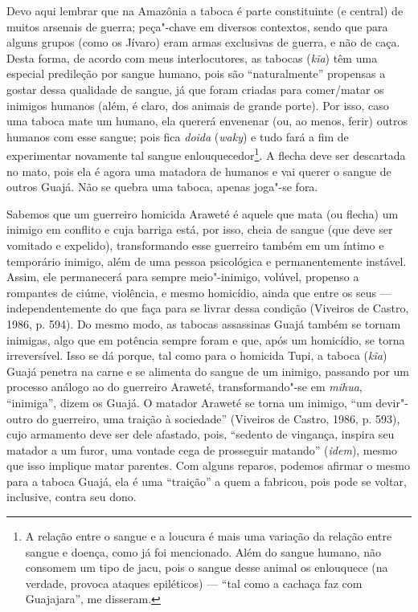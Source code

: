 Devo aqui lembrar que na Amazônia a taboca é parte constituinte (e
central) de muitos arsenais de guerra; peça"-chave em diversos contextos,
sendo que para alguns grupos (como os Jívaro) eram armas exclusivas de
guerra, e não de caça. Desta forma, de acordo com meus interlocutores,
as tabocas (\emph{kĩa}) têm uma especial predileção por sangue humano,
pois são ``naturalmente'' propensas a gostar dessa qualidade de sangue, já
que foram criadas para comer/matar os inimigos humanos (além, é claro,
dos animais de grande porte). Por isso, caso uma taboca mate um humano,
ela quererá envenenar (ou, ao menos, ferir) outros humanos com esse
sangue; pois fica \emph{doida} (\emph{waky}) e tudo fará a fim de
experimentar novamente tal sangue enlouquecedor\footnote{A relação entre
  o sangue e a loucura é mais uma variação da relação entre sangue e
  doença, como já foi mencionado. Além do sangue humano, não consomem um
  tipo de jacu, pois o sangue desse animal os enlouquece (na verdade,
  provoca ataques epiléticos) --- ``tal como a cachaça faz com Guajajara'',
  me disseram.}. A flecha deve ser descartada no mato, pois ela é agora
uma matadora de humanos e vai querer o sangue de outros Guajá. Não se
quebra uma taboca, apenas joga"-se fora.

Sabemos que um guerreiro homicida Araweté é aquele que mata (ou flecha)
um inimigo em conflito e cuja barriga está, por isso, cheia de sangue
(que deve ser vomitado e expelido), transformando esse guerreiro também
em um íntimo e temporário inimigo, além de uma pessoa psicológica e
permanentemente instável. Assim, ele permanecerá para sempre
meio"-inimigo, volúvel, propenso a rompantes de ciúme, violência, e mesmo
homicídio, ainda que entre os seus --- independentemente do que faça para
se livrar dessa condição (Viveiros de Castro, 1986, p. 594). Do mesmo
modo, as tabocas assassinas Guajá também se tornam inimigas, algo que em
potência sempre foram e que, após um homicídio, se torna irreversível.
Isso se dá porque, tal como para o homicida Tupi, a taboca (\emph{kĩa})
Guajá penetra na carne e se alimenta do sangue de um inimigo, passando
por um processo análogo ao do guerreiro Araweté, transformando"-se em
\emph{mihua}, ``inimiga'', dizem os Guajá. O matador Araweté se torna um
inimigo, ``um devir"-outro do guerreiro, uma traição à sociedade''
(Viveiros de Castro, 1986, p. 593), cujo armamento deve ser dele
afastado, pois, ``sedento de vingança, inspira seu matador a um furor,
uma vontade cega de prosseguir matando'' (\emph{idem}), mesmo que isso implique
matar parentes. Com alguns reparos, podemos afirmar o mesmo para a
taboca Guajá, ela é uma ``traição'' a quem a fabricou, pois pode se
voltar, inclusive, contra seu dono.

